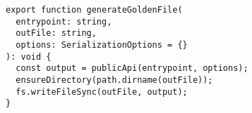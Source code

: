 \begin{verbatim}
export function generateGoldenFile(
  entrypoint: string,
  outFile: string,
  options: SerializationOptions = {}
): void {
  const output = publicApi(entrypoint, options);
  ensureDirectory(path.dirname(outFile));
  fs.writeFileSync(outFile, output);
}
\end{verbatim}
